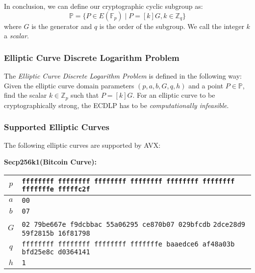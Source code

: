 In conclusion, we can define our cryptographic cyclic subgroup as:
\[ \mathbb{P} = \{ P \in E(\mathbb{F}_p) \mid P = [k]G, k \in \mathbb{Z}_q \} \]
where $G$ is the generator and $q$ is the order of the subgroup. We call the integer $k$ a \textit{scalar}.


\subsubsection{Elliptic Curve Discrete Logarithm Problem} \label{app: elliptic curve discrete logarithm problem}
The \textit{Elliptic Curve Discrete Logarithm Problem} is defined in \cite{Trappe05} the following way: Given the elliptic curve domain parameters $(p, a, b, G, q, h)$ and a point $P \in \mathbb{P}$, find the scalar $k \in \mathbb{Z}_p$ such that $P = [k]G$. For an elliptic curve to be cryptographically strong, the ECDLP has to be \textit{computationally infeasible}.


\subsubsection{Supported Elliptic Curves} \label{app: supported elliptic curves}
The following elliptic curves are supported by AVX:

\textbf{Secp256k1(Bitcoin Curve):}
\begin{center}
\begin{tabular}{|c|p{9.8cm}|} \hline
    $p$ &   \texttt{ffffffff ffffffff ffffffff ffffffff ffffffff ffffffff} \newline
    \texttt{fffffffe fffffc2f} \\ \hline
    $a$ &   \texttt{\phantom{000000}00} \\ \hline
    $b$ &   \texttt{\phantom{000000}07} \\ \hline
    $G$ &   \texttt{\phantom{000000}02 79be667e f9dcbbac 55a06295 ce870b07 029bfcdb} \newline
    \texttt{2dce28d9 59f2815b 16f81798} \\ \hline
    $q$ &   \texttt{ffffffff ffffffff ffffffff fffffffe baaedce6 af48a03b} \newline
    \texttt{bfd25e8c d0364141} \\ \hline
    $h$ & \texttt{1} \\ \hline
\end{tabular}    
\end{center} 

